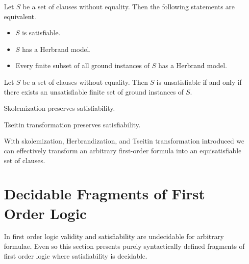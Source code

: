 \begin{theorem}[Herbrand, 1930]\label{the:herbrand}
	Let \( S \) be a set of clauses without equality. Then the following statements are equivalent.
	\begin{itemize}
		\item \( S \) is satisfiable.
		\item \( S \) has a Herbrand model.
		\item Every finite subset of all ground instances of \( S \) has a Herbrand model.
	\end{itemize}
\end{theorem}

\begin{corollary}
	Let \( S \) be a set of clauses without equality.
	Then \( S \) is unsatisfiable if and only if there exists
	an unsatisfiable finite set of ground instances of \( S \).
\end{corollary}

\begin{lemma}
	Skolemization preserves satisfiability.
\end{lemma}

\begin{lemma}
	Tseitin transformation preserves satisfiability.
\end{lemma}


\begin{lemma}
With skolemization, Herbrandization, and Tseitin transformation introduced 
we can effectively transform an arbitrary first-order formula 
into an equisatisfiable set of clauses.
\end{lemma}


\section{Decidable Fragments of First Order Logic}\label{sec:decidable:fol:fragments}

In first order logic validity and satisfiability are undecidable for arbitrary formulae.
Even so this section presents purely syntactically defined fragments
of first order logic where satisfiability is decidable.%

